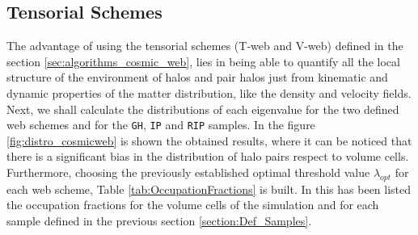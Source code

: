 \documentclass[usenatbib]{latex/mn2e}
\begin{document}
\subsection{Tensorial Schemes}
\label{subsec:tensorial schemes}



The advantage of using the tensorial schemes (T-web and V-web) defined in
the section \ref{sec:algorithms_cosmic_web}, lies in being able to quantify
all the local structure of the environment of halos and pair halos just 
from kinematic and dynamic properties of the matter distribution, like the
density and velocity fields. Next, we shall calculate the distributions of 
each eigenvalue for the two defined web schemes and for the \texttt{GH}, 
\texttt{IP} and \texttt{RIP} samples. In the figure 
\ref{fig:distro_cosmicweb} is shown the obtained results, where it can be 
noticed that there is a significant bias in the distribution of halo 
pairs respect to volume cells. Furthermore, choosing the previously 
established optimal threshold value $\lambda_{opt}$ for each web scheme, 
Table \ref{tab:OccupationFractions} is built. In this has been 
listed the occupation fractions for the volume cells of the simulation 
and for each sample defined in the previous section 
\ref{section:Def_Samples}.
\end{document}
